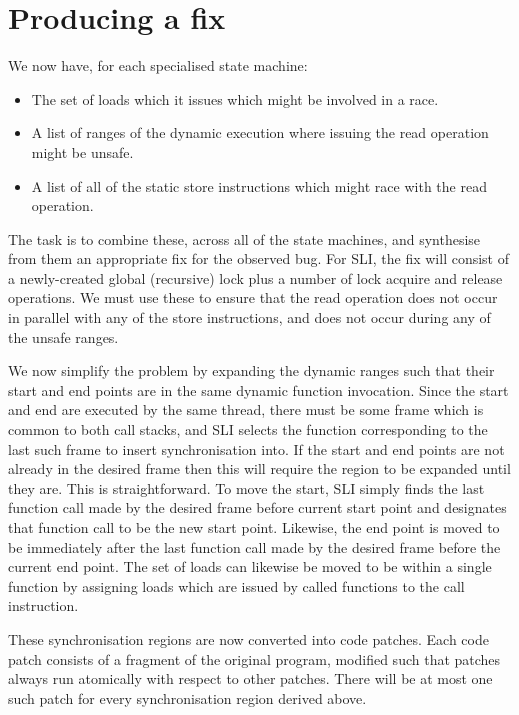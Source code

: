 \documentclass[10pt,twocolumn,preprint,natbib,authoryear]{sigplanconf}
\begin{document}
\section{Producing a fix}
We now have, for each specialised state machine:

\begin{itemize}
\item The set of loads which it issues which might be involved in a
  race.
\item A list of ranges of the dynamic execution where issuing the
  read operation might be unsafe.
\item A list of all of the static store instructions which might race with
  the read operation.
\end{itemize}

The task is to combine these, across all of the state machines, and
synthesise from them an appropriate fix for the observed bug.  For
SLI, the fix will consist of a newly-created global (recursive) lock
plus a number of lock acquire and release operations.  We must use
these to ensure that the read operation does not occur in parallel
with any of the store instructions, and does not occur during any of
the unsafe ranges.

We now simplify the problem by expanding the dynamic ranges such that
their start and end points are in the same dynamic function
invocation.  Since the start and end are executed by the same thread,
there must be some frame which is common to both call stacks, and SLI
selects the function corresponding to the last such frame to insert
synchronisation into.  If the start and end points are not already in
the desired frame then this will require the region to be expanded
until they are.  This is straightforward.  To move the start, SLI
simply finds the last function call made by the desired frame before
current start point and designates that function call to be the new
start point.  Likewise, the end point is moved to be immediately after
the last function call made by the desired frame before the current
end point.  The set of loads can likewise be moved to be within a
single function by assigning loads which are issued by called
functions to the call instruction.

These synchronisation regions are now converted into code patches.
Each code patch consists of a fragment of the original program,
modified such that patches always run atomically with respect to other
patches.  There will be at most one such patch for every
synchronisation region derived above.
\end{document}
